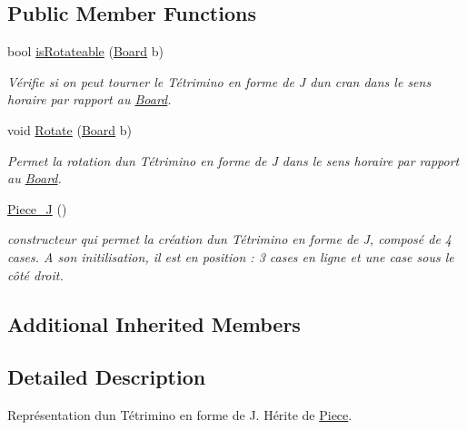 \subsection*{Public Member Functions}
\begin{DoxyCompactItemize}
\item 
bool \hyperlink{classPiece__J_aee0abd6254be3a50a86ff5464bb459f8}{is\+Rotateable} (\hyperlink{classBoard}{Board} b)
\begin{DoxyCompactList}\small\item\em Vérifie si on peut tourner le Tétrimino en forme de J d\textquotesingle{}un cran dans le sens horaire par rapport au \hyperlink{classBoard}{Board}. \end{DoxyCompactList}\item 
void \hyperlink{classPiece__J_a05b85a353b6d5cefb0055206d4a39014}{Rotate} (\hyperlink{classBoard}{Board} b)
\begin{DoxyCompactList}\small\item\em Permet la rotation d\textquotesingle{}un Tétrimino en forme de J dans le sens horaire par rapport au \hyperlink{classBoard}{Board}. \end{DoxyCompactList}\item 
\mbox{\label{classPiece__J_ac7299340d86be483ba59e3befce76327}} 
\hyperlink{classPiece__J_ac7299340d86be483ba59e3befce76327}{Piece\+\_\+J} ()
\begin{DoxyCompactList}\small\item\em constructeur qui permet la création d\textquotesingle{}un Tétrimino en forme de J, composé de 4 cases. A son initilisation, il est en position \+: 3 cases en ligne et une case sous le côté droit. \end{DoxyCompactList}\end{DoxyCompactItemize}
\subsection*{Additional Inherited Members}


\subsection{Detailed Description}
Représentation d\textquotesingle{}un Tétrimino en forme de J. Hérite de \hyperlink{classPiece}{Piece}. 

